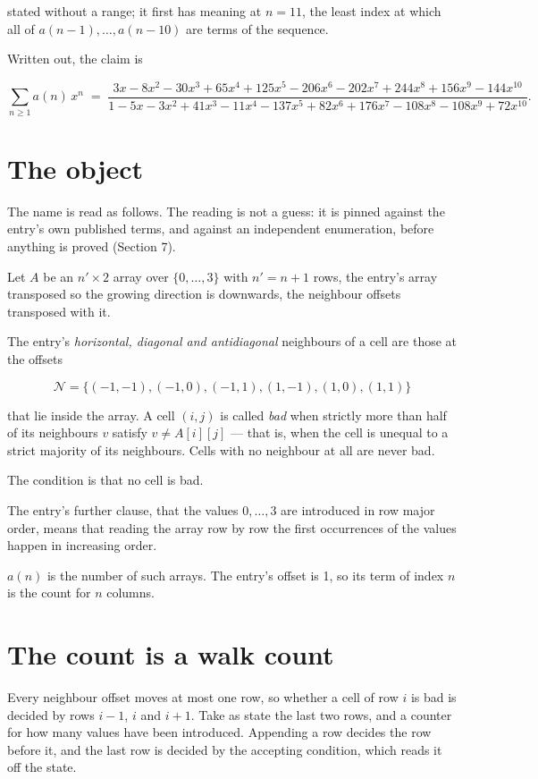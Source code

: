 \documentclass[11pt]{article}
\theoremstyle{definition}
\begin{document}
stated without a range; it first has meaning at $n = 11$, the least index at which all of $a(n-1),\dots,a(n-10)$ are terms of the sequence.

Written out, the claim is

\[\sum_{n \ge 1} a(n)\,x^n \;=\; \frac{3x - 8x^{2} - 30x^{3} + 65x^{4} + 125x^{5} - 206x^{6} - 202x^{7} + 244x^{8} + 156x^{9} - 144x^{10}}{1 - 5x - 3x^{2} + 41x^{3} - 11x^{4} - 137x^{5} + 82x^{6} + 176x^{7} - 108x^{8} - 108x^{9} + 72x^{10}}.\]

\section{The object}

The name is read as follows. The reading is not a guess: it is pinned against the entry's own published terms, and against an independent enumeration, before anything is proved (Section 7).

Let $A$ be an $n' \times 2$ array over $\{0,\dots,3\}$ with $n' = n + 1$ rows, the entry's array transposed so the growing direction is downwards, the neighbour offsets transposed with it.

The entry's {\itshape horizontal, diagonal and antidiagonal} neighbours of a cell are those at the offsets

\[\mathcal{N} = \{(-1,-1), (-1,0), (-1,1), (1,-1), (1,0), (1,1)\}\]

that lie inside the array. A cell $(i,j)$ is called {\itshape bad} when strictly more than half of its neighbours $v$ satisfy $v \ne A[i][j]$ --- that is, when the cell is unequal to a strict majority of its neighbours. Cells with no neighbour at all are never bad.

The condition is that no cell is bad.

The entry's further clause, that the values $0,\dots,3$ are introduced in row major order, means that reading the array row by row the first occurrences of the values happen in increasing order.

$a(n)$ is the number of such arrays. The entry's offset is 1, so its term of index $n$ is the count for $n$ columns.

\section{The count is a walk count}

Every neighbour offset moves at most one row, so whether a cell of row $i$ is bad is decided by rows $i-1$, $i$ and $i+1$. Take as state the last two rows, and a counter for how many values have been introduced. Appending a row decides the row before it, and the last row is decided by the accepting condition, which reads it off the state.
\end{document}
